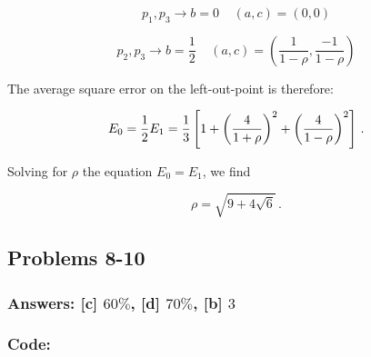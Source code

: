 \documentclass[11pt]{article}
\begin{document}
\begin{equation}
p_1,p_3 \rightarrow b=0 \;\;\;\;  (a,c)=\left(0,0\right)
\end{equation}

\begin{equation}
p_2,p_3 \rightarrow b=\frac{1}{2} \;\;\;\;  (a,c)=\left(\frac{1}{1-\rho},\frac{-1}{1-\rho}\right)
\end{equation}

The average square error on the left-out-point is therefore:

\begin{equation}
E_0=\frac{1}{2} \\
E_1=\frac{1}{3} \left[1 + \left(\frac{4}{1+\rho}\right)^2 + \left(\frac{4}{1-\rho}\right)^2 \right]\,.
\end{equation}

Solving for \(\rho\) the equation \(E_0=E_1\), we find

\begin{equation}
\rho=\sqrt{9+4\sqrt{6}}\,.
\end{equation}

    \hypertarget{problems-8-10}{%
\subsection{Problems 8-10}\label{problems-8-10}}

\hypertarget{answers-c-60-d-70-b-3}{%
\subsubsection{\texorpdfstring{Answers: {[}c{]} \(60 \%\), {[}d{]}
\(70 \%\), {[}b{]}
\(3\)}{Answers: {[}c{]} 60 \textbackslash{}\%, {[}d{]} 70 \textbackslash{}\%, {[}b{]} 3}}\label{answers-c-60-d-70-b-3}}

\hypertarget{code}{%
\subsubsection{Code:}\label{code}}
\end{document}
